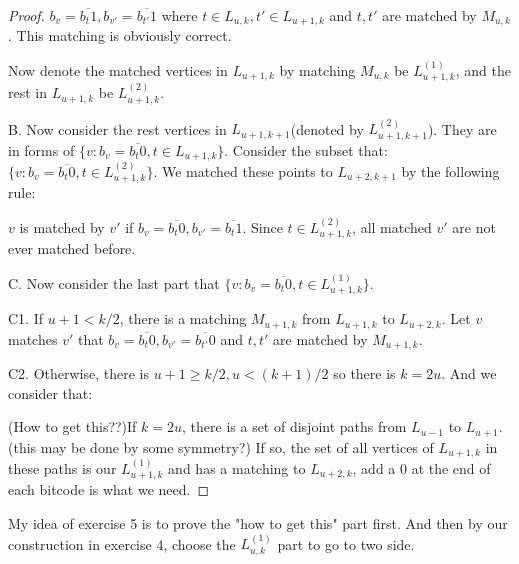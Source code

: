 \begin{proof}
        $b_v=\overline{b_t1},b_{v'}=\overline{b_{t'}1}$ where $t\in L_{u,k},t'\in L_{u+1,k}$ 
        and $t,t'$ are matched by $M_{u,k}$. This matching is obviously correct. 
        
        Now denote the matched vertices in $L_{u+1,k}$ by matching $M_{u,k}$ be $L_{u+1,k}^{(1)}$, 
        and the rest in $L_{u+1,k}$ be $L_{u+1,k}^{(2)}$. 

        B. Now consider the rest vertices in $L_{u+1,k+1}$(denoted by $L_{u+1,k+1}^{(2)}$). 
        They are in forms of $\{v:b_v=\overline{b_t0},t\in L_{u+1,k}\}$. Consider the subset that: 
        $\{v:b_v=\overline{b_t0},t\in L_{u+1,k}^{(2)}\}$. We matched these points to $L_{u+2,k+1}$ by the following rule: 
        
        $v$ is matched by $v'$ if $b_v=\overline{b_t0},b_{v'}=\overline{b_t1}$. Since $t\in L_{u+1,k}^{(2)}$, 
        all matched $v'$ are not ever matched before. 

        C. Now consider the last part that $\{v:b_v=\overline{b_t0},t\in L_{u+1,k}^{(1)}\}$. 
        
        C1. If $u+1<k/2$, there is a matching $M_{u+1,k}$ from $L_{u+1,k}$ to $L_{u+2,k}$. 
        Let $v$ matches $v'$ that $b_v=\overline{b_t0},b_{v'}=\overline{b_{t'}0}$ and $t,t'$ are matched by $M_{u+1,k}$. 

        C2. Otherwise, there is $u+1\geq k/2,u<(k+1)/2$ so there is $k=2u$. And we consider that: 
        
        (How to get this??)If $k=2u$, there is a set of disjoint paths from $L_{u-1}$ to $L_{u+1}$.(this may be done by some symmetry?) 
        If so, the set of all vertices of $L_{u+1,k}$ in these paths is our $L_{u+1,k}^{(1)}$ 
        and has a matching to $L_{u+2,k}$, add a 0 at the end of each bitcode is what we need. 
    \end{proof} 

    My idea of exercise 5 is to prove the "how to get this" part first. 
    And then by our construction in exercise 4, choose the $L_{u,k}^{(1)}$ part to go to two side. 



